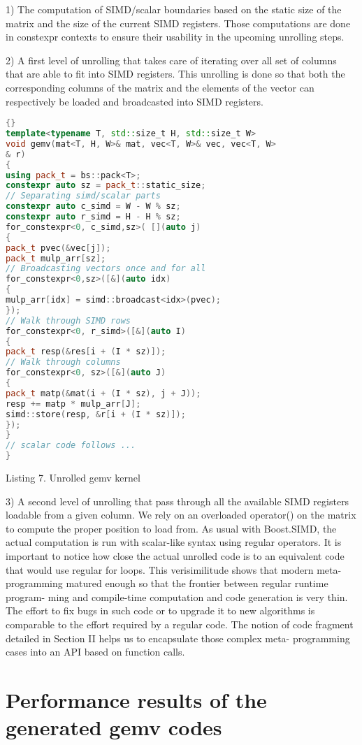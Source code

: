\documentclass[../../main.tex]{subfiles}
\begin{document}
1) The computation of SIMD/scalar boundaries based
on the static size of the matrix and the size of the
current SIMD registers. Those computations are done
in constexpr contexts to ensure their usability in the
upcoming unrolling steps.

2) A first level of unrolling that takes care of iterating
over all set of columns that are able to fit into SIMD
registers. This unrolling is done so that both the
corresponding columns of the matrix and the elements
of the vector can respectively be loaded and broadcasted
into SIMD registers.

\begin{lstlisting}[language=c++]{}
template<typename T, std::size_t H, std::size_t W>
void gemv(mat<T, H, W>& mat, vec<T, W>& vec, vec<T, W>
& r)
{
using pack_t = bs::pack<T>;
constexpr auto sz = pack_t::static_size;
// Separating simd/scalar parts
constexpr auto c_simd = W - W % sz;
constexpr auto r_simd = H - H % sz;
for_constexpr<0, c_simd,sz>( [](auto j)
{
pack_t pvec(&vec[j]);
pack_t mulp_arr[sz];
// Broadcasting vectors once and for all
for_constexpr<0,sz>([&](auto idx)
{
mulp_arr[idx] = simd::broadcast<idx>(pvec);
});
// Walk through SIMD rows
for_constexpr<0, r_simd>([&](auto I)
{
pack_t resp(&res[i + (I * sz)]);
// Walk through columns
for_constexpr<0, sz>([&](auto J)
{
pack_t matp(&mat(i + (I * sz), j + J));
resp += matp * mulp_arr[J];
simd::store(resp, &r[i + (I * sz)]);
});
}
// scalar code follows ...
}
\end{lstlisting}
Listing 7. Unrolled gemv kernel

3) A second level of unrolling that pass through all the
available SIMD registers loadable from a given column.
We rely on an overloaded operator() on the matrix
to compute the proper position to load from. As usual
with Boost.SIMD, the actual computation is run with
scalar-like syntax using regular operators.
It is important to notice how close the actual unrolled code
is to an equivalent code that would use regular for loops. This
verisimilitude shows that modern meta-programming matured
enough so that the frontier between regular runtime program-
ming and compile-time computation and code generation is
very thin. The effort to fix bugs in such code or to upgrade
it to new algorithms is comparable to the effort required
by a regular code. The notion of code fragment detailed
in Section II helps us to encapsulate those complex meta-
programming cases into an API based on function calls.

\section{Performance results of the generated gemv codes}
\end{document}
